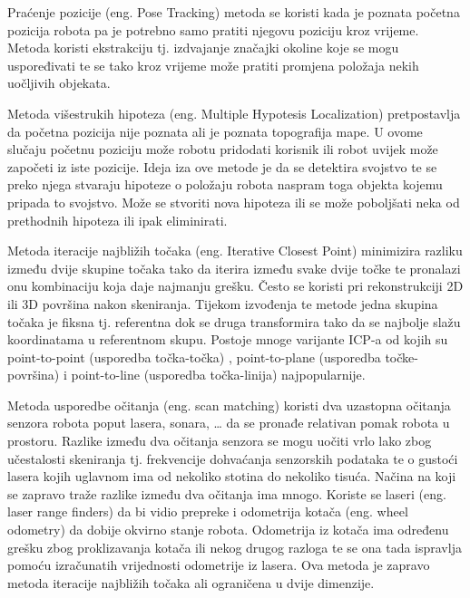 Praćenje pozicije (eng. Pose Tracking) metoda se koristi kada je poznata početna pozicija robota pa je potrebno samo pratiti njegovu poziciju kroz vrijeme. Metoda koristi ekstrakciju tj. izdvajanje značajki okoline koje se mogu uspoređivati te se tako kroz vrijeme može pratiti promjena položaja nekih uočljivih objekata.

Metoda višestrukih hipoteza (eng. Multiple Hypotesis Localization) pretpostavlja da početna pozicija nije poznata ali je poznata topografija mape. U ovome slučaju početnu poziciju može robotu pridodati korisnik ili robot uvijek može započeti iz iste pozicije. Ideja iza ove metode je da se detektira svojstvo te se preko njega stvaraju hipoteze o položaju robota naspram toga objekta kojemu pripada to svojstvo. Može se stvoriti nova hipoteza ili se može poboljšati neka od prethodnih hipoteza ili ipak eliminirati.

Metoda iteracije najbližih točaka (eng. Iterative Closest Point) minimizira razliku između dvije skupine točaka tako da iterira između svake dvije točke te pronalazi onu kombinaciju koja daje najmanju grešku. Često se koristi pri rekonstrukciji 2D ili 3D površina nakon skeniranja. Tijekom izvođenja te metode jedna skupina točaka je fiksna tj. referentna dok se druga transformira tako da se najbolje slažu koordinatama u referentnom skupu. Postoje mnoge varijante ICP-a od kojih su point-to-point (usporedba točka-točka) , point-to-plane (usporedba točke-površina) i point-to-line (usporedba točka-linija) najpopularnije.

Metoda usporedbe očitanja (eng. scan matching) koristi dva uzastopna očitanja senzora robota poput lasera, sonara, … da se pronađe relativan pomak robota u prostoru. Razlike između dva očitanja senzora se mogu uočiti vrlo lako zbog učestalosti skeniranja tj. frekvencije dohvaćanja senzorskih podataka te o gustoći lasera kojih uglavnom ima od nekoliko stotina do nekoliko tisuća. Načina na koji se zapravo traže razlike između dva očitanja ima mnogo. Koriste se laseri (eng. laser range finders) da bi vidio prepreke i odometrija kotača (eng. wheel odometry) da dobije okvirno stanje robota. Odometrija iz kotača ima određenu grešku zbog proklizavanja kotača ili nekog drugog razloga te se ona tada ispravlja pomoću izračunatih vrijednosti odometrije iz lasera. Ova metoda je zapravo metoda iteracije najbližih točaka ali ograničena u dvije dimenzije.

